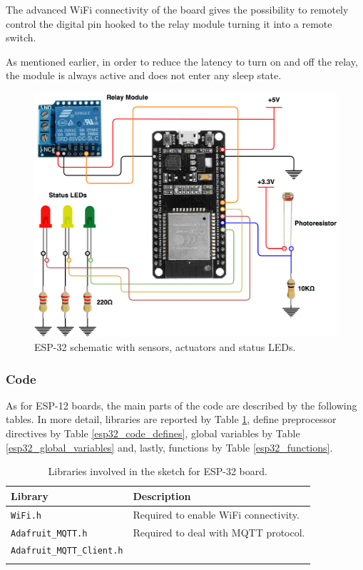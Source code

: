 The advanced WiFi connectivity of the board gives the possibility to remotely control the digital pin hooked to the relay module turning it into a remote switch.

As mentioned earlier, in order to reduce the latency to turn on and off the relay, the module is always active and does not enter any sleep state.

\begin{figure}[H]
	\begin{center}
		\includegraphics[width=\textwidth]{./pictures/ESP-32_wiring.png}
		\caption{ESP-32 schematic with sensors, actuators and status LEDs.}
		\label{esp32_wiring}
	\end{center}
\end{figure}

\subsubsection{Code}
As for ESP-12 boards, the main parts of the code are described by the following tables. In more detail, libraries are reported by Table \ref{esp32_code_libraries}, define preprocessor directives by Table \ref{esp32_code_defines}, global variables by Table \ref{esp32_global_variables} and, lastly, functions by Table \ref{esp32_functions}.

\noindent\begin{minipage}{\textwidth}
	\begingroup
	\setlength{\LTleft}{-20cm plus -1fill}
	\setlength{\LTright}{\LTleft}
	\begin{longtable}{l | l}
		\hline
		\textbf{Library} & \textbf{Description} \\
		\hline
		\hline
		\texttt{WiFi.h} & Required to enable WiFi connectivity. \\
		\hline
		\texttt{Adafruit\_MQTT.h} & Required to deal with MQTT protocol. \\ 
		\texttt{Adafruit\_MQTT\_Client.h} & \\
		\hline
		
		\caption{Libraries involved in the sketch for ESP-32 board.}
		\label{esp32_code_libraries}
	\end{longtable}
	\endgroup
\end{minipage}

